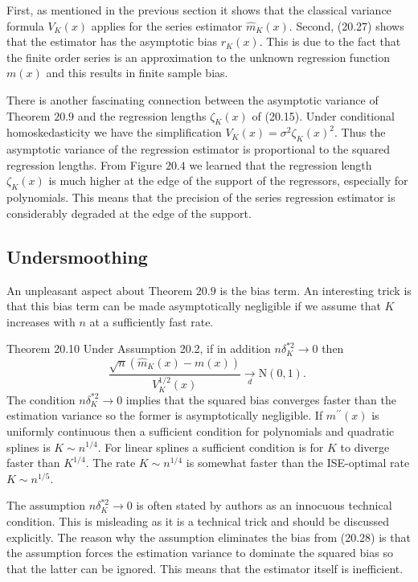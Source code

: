 \documentclass[10pt]{article}
\begin{document}
First, as mentioned in the previous section it shows that the classical variance formula $V_{K}(x)$ applies for the series estimator $\widehat{m}_{K}(x)$. Second, (20.27) shows that the estimator has the asymptotic bias $r_{K}(x)$. This is due to the fact that the finite order series is an approximation to the unknown regression function $m(x)$ and this results in finite sample bias.

There is another fascinating connection between the asymptotic variance of Theorem $20.9$ and the regression lengths $\zeta_{K}(x)$ of (20.15). Under conditional homoskedasticity we have the simplification $V_{K}(x)=\sigma^{2} \zeta_{K}(x)^{2}$. Thus the asymptotic variance of the regression estimator is proportional to the squared regression lengths. From Figure $20.4$ we learned that the regression length $\zeta_{K}(x)$ is much higher at the edge of the support of the regressors, especially for polynomials. This means that the precision of the series regression estimator is considerably degraded at the edge of the support.

\subsection{Undersmoothing}
An unpleasant aspect about Theorem $20.9$ is the bias term. An interesting trick is that this bias term can be made asymptotically negligible if we assume that $K$ increases with $n$ at a sufficiently fast rate.

Theorem 20.10 Under Assumption 20.2, if in addition $n \delta_{K}^{* 2} \rightarrow 0$ then
$$
\frac{\sqrt{n}\left(\widehat{m}_{K}(x)-m(x)\right)}{V_{K}^{1 / 2}(x)} \underset{d}{\longrightarrow} \mathrm{N}(0,1) \text {. }
$$
The condition $n \delta_{K}^{* 2} \rightarrow 0$ implies that the squared bias converges faster than the estimation variance so the former is asymptotically negligible. If $m^{\prime \prime}(x)$ is uniformly continuous then a sufficient condition for polynomials and quadratic splines is $K \sim n^{1 / 4}$. For linear splines a sufficient condition is for $K$ to diverge faster than $K^{1 / 4}$. The rate $K \sim n^{1 / 4}$ is somewhat faster than the ISE-optimal rate $K \sim n^{1 / 5}$.

The assumption $n \delta_{K}^{* 2} \rightarrow 0$ is often stated by authors as an innocuous technical condition. This is misleading as it is a technical trick and should be discussed explicitly. The reason why the assumption eliminates the bias from (20.28) is that the assumption forces the estimation variance to dominate the squared bias so that the latter can be ignored. This means that the estimator itself is inefficient.
\end{document}
